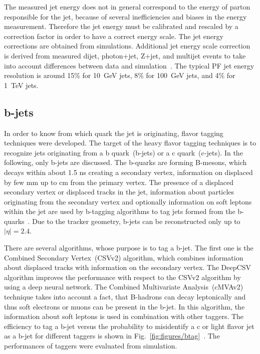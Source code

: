 The measured jet energy does not in general correspond to the energy of parton responsible for the jet, because of several inefficiencies and biases in the energy measurement. Therefore the jet energy must be calibrated and rescaled by a correction factor in order to have a correct energy scale. The jet energy corrections are obtained from simulations. Additional jet energy scale correction is derived from measured dijet, photon+jet, Z+jet, and multijet events to take into account differences between data and simulation~\cite{Khachatryan:2016kdb}. The typical PF jet energy resolution is around 15\% for 10~GeV jets, 8\% for 100~GeV jets, and 4\% for 1~TeV jets. %

\subsection{b-jets}

In order to know from which quark the jet is originating, flavor tagging techniques were developed. The target of the heavy flavor tagging techniques is to recognize jets originating from a b quark~(b-jets) or a c quark~(c-jets). In the following, only b-jets are discussed. The b-quarks are forming B-mesons, which decays within about 1.5 ns creating a secondary vertex, information on displaced by few mm up to cm from the primary vertex. The presence of a displaced secondary vertex or displaced tracks in the jet, information about particles originating from the secondary vertex and optionally information on soft leptons within the jet are used by b-tagging algorithms to tag jets formed from the b-quarks~\cite{Sirunyan:2017ezt}. Due to the tracker geometry, b-jets can be reconstructed only up to $|\eta|=2.4$.

There are several algorithms, whose purpose is to tag a b-jet. The first one is the Combined Secondary Vertex~(CSVv2) algorithm, which combines information about displaced tracks with information on the secondary vertex. The DeepCSV algorithm improves the performance with respect to the CSVv2 algorithm by using a deep neural network. The Combined Multivariate Analysis~(cMVAv2) technique takes into account a fact, that B-hadrons can decay leptonically and thus soft electrons or muons can be present in the b-jet. In this algorithm, the information about soft leptons is used in combination with other taggers. The efficiency to tag a b-jet versus the probability to misidentify a c or light flavor jet as a b-jet for different taggers is shown in Fig.~\ref{fig:figures/btag}~\cite{Sirunyan:2017ezt}. The performances of taggers were evaluated from simulation.


